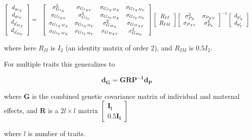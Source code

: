 \documentclass[titlepage]{article}  %
\begin{document}
\scriptsize
\begin{eqnarray*}
 \left[ \begin{array}{c}
 d_{g_{I_{X}}} \\
 d_{g_{I_{Y}}} \\
 d_{g^{\prime}_{M_{X}}} \\
 d_{g^{\prime}_{M_{Y}}}
\end{array} \right]
 & = &
 \left[ \begin{array}{c c c c}
 \sigma^{2}_{G_{I_{X}}} & \sigma_{G_{I_{XY}}} & \sigma_{G_{I_{X}M_{X}}} & \sigma_{G_{I_{X}M_{Y}}} \\
 \sigma_{G_{I_{XY}}} & \sigma^{2}_{G_{I_{Y}}} & \sigma_{G_{I_{Y}M_{X}}} & \sigma_{G_{I_{Y}M_{Y}}} \\
 \sigma_{G_{I_{X}M_{X}}} & \sigma_{G_{I_{X}M_{Y}}} & \sigma^{2}_{G_{M_{X}}} & \sigma_{G_{M_{XY}}} \\
 \sigma_{G_{I_{Y}M_{X}}} & \sigma_{G_{I_{Y}M_{Y}}} & \sigma_{G_{M_{XY}}} & \sigma^{2}_{G_{M_{Y}}}
\end{array} \right] 
 \left[ \begin{array}{c}
 R_{II} \\
 R_{IM}
\end{array} \right]
\left[ \begin{array}{cc}
 \sigma^{2}_{P_{X}} & \sigma_{P_{XY}} \\
 \sigma_{P_{XY}} & \sigma^{2}_{P_{Y}}
\end{array} \right] ^{-1}
 \left[ \begin{array}{c}
 d_{p^{\prime}_{X}} \\
 d_{p^{\prime}_{Y}}
\end{array} \right]
\end{eqnarray*}
\normalsize


where here $R_{II}$ is $I_{2}$ (an identity matrix of order 2), and $R_{IM}$ is $0.5 I_{2}$.

For multiple traits this generalizes to 

\begin{equation}
\bm{d_{G} = G R P^{-1} d_{P}}
\end{equation}

where $\bm{G}$ is the combined genetic covariance matrix of individual and maternal effects, and $\bm{R}$ is a $2l \times l$ matrix $ \left[ \begin{array}{c}
 \bm{I_{l}} \\
 0.5 \bm{I_{l}}
\end{array} \right]
$

where $l$ is number of traits.
\end{document}
